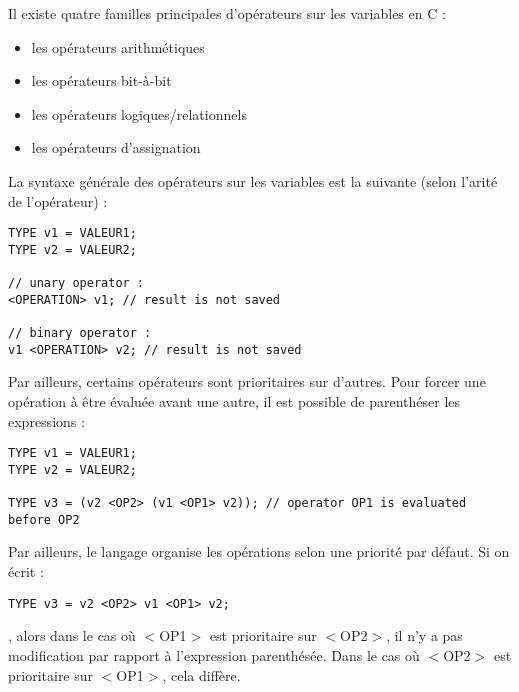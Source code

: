 \documentclass[../../../main.tex]{subfiles}
\begin{document}

Il existe quatre familles principales d'opérateurs sur les variables en C :
\begin{itemize}
	\item les opérateurs arithmétiques
	\item les opérateurs bit-à-bit
	\item les opérateurs logiques/relationnels
	\item les opérateurs d'assignation
\end{itemize}
La syntaxe générale des opérateurs sur les variables est la suivante (selon l'arité de l'opérateur) :
\begin{verbatim}
TYPE v1 = VALEUR1;
TYPE v2 = VALEUR2;

// unary operator :
<OPERATION> v1; // result is not saved

// binary operator :
v1 <OPERATION> v2; // result is not saved
\end{verbatim}
Par ailleurs, certains opérateurs sont prioritaires sur d'autres. Pour forcer une opération à être évaluée avant une autre, il est possible de parenthéser les expressions :
\begin{verbatim}
TYPE v1 = VALEUR1;
TYPE v2 = VALEUR2;

TYPE v3 = (v2 <OP2> (v1 <OP1> v2)); // operator OP1 is evaluated before OP2
\end{verbatim}
Par ailleurs, le langage organise les opérations selon une priorité par défaut. Si on écrit :
\begin{verbatim}
TYPE v3 = v2 <OP2> v1 <OP1> v2;
\end{verbatim}
, alors dans le cas où \textsf{$<$OP1$>$} est prioritaire sur \textsf{$<$OP2$>$}, il n'y a pas modification par rapport à l'expression parenthésée. Dans le cas où \textsf{$<$OP2$>$} est prioritaire sur \textsf{$<$OP1$>$}, cela diffère.
 
\end{document}
